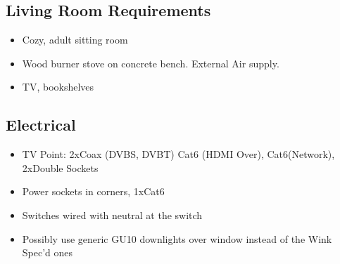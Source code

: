 \subsection{Living Room Requirements}
\begin{itemize}
\item Cozy, adult sitting room
\item Wood burner stove on concrete bench. External Air supply. 
\item TV, bookshelves
\end{itemize}


\subsection{Electrical}
\begin{itemize}
\item TV Point: 2xCoax (DVBS, DVBT) Cat6 (HDMI Over), Cat6(Network), 2xDouble Sockets
\item Power sockets in corners, 1xCat6
\item Switches wired with neutral at the switch
\item Possibly use generic GU10 downlights over window instead of the Wink Spec'd ones
\end{itemize}
